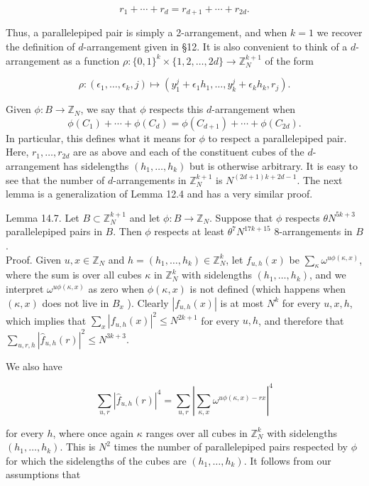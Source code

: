 \documentclass[10pt]{article}
\begin{document}
$$
r_{1}+\cdots+r_{d}=r_{d+1}+\cdots+r_{2 d} .
$$

Thus, a parallelepiped pair is simply a 2-arrangement, and when $k=1$ we recover the definition of $d$-arrangement given in §12. It is also convenient to think of a $d$-arrangement as a function $\rho:\{0,1\}^{k} \times\{1,2, \ldots, 2 d\} \rightarrow \mathbb{Z}_{N}^{k+1}$ of the form

$$
\rho:\left(\epsilon_{1}, \ldots, \epsilon_{k}, j\right) \mapsto\left(y_{1}^{j}+\epsilon_{1} h_{1}, \ldots, y_{k}^{j}+\epsilon_{k} h_{k}, r_{j}\right) .
$$

Given $\phi:B\to\mathbb Z_N$, we say that $\phi$ respects this
$d$-arrangement when
\[
  \phi(C_1)+\cdots+\phi(C_d)
  =\phi(C_{d+1})+\cdots+\phi(C_{2d}).
\]
In particular, this defines what it means for $\phi$ to respect a
parallelepiped pair. Here, $r_{1}, \ldots, r_{2 d}$ are as above and each of the constituent cubes of the $d$-arrangement has sidelengths $\left(h_{1}, \ldots, h_{k}\right)$ but is otherwise arbitrary. It is easy to see that the number of $d$-arrangements in $\mathbb{Z}_{N}^{k+1}$ is $N^{(2 d+1) k+2 d-1}$. The next lemma is a generalization of Lemma 12.4 and has a very similar proof.

Lemma 14.7. Let $B \subset \mathbb{Z}_{N}^{k+1}$ and let $\phi: B \rightarrow \mathbb{Z}_{N}$. Suppose that $\phi$ respects $\theta N^{5 k+3}$ parallelepiped pairs in $B$. Then $\phi$ respects at least $\theta^{7} N^{17 k+15}$ 8-arrangements in $B$.\\
Proof. Given $u, x \in \mathbb{Z}_{N}$ and $h=\left(h_{1}, \ldots, h_{k}\right) \in \mathbb{Z}_{N}^{k}$, let $f_{u, h}(x)$ be $\sum_{\kappa} \omega^{u \phi(\kappa, x)}$, where the sum is over all cubes $\kappa$ in $\mathbb{Z}_{N}^{k}$ with sidelengths $\left(h_{1}, \ldots, h_{k}\right)$, and we interpret $\omega^{u \phi(\kappa, x)}$ as zero when $\phi(\kappa, x)$ is not defined (which happens when $(\kappa, x)$ does not live in $B_{x}$ ). Clearly $\left|f_{u, h}(x)\right|$ is at most $N^{k}$ for every $u, x, h$, which implies that $\sum_{x}\left|f_{u, h}(x)\right|^{2} \leqslant N^{2 k+1}$ for every $u, h$, and therefore that $\sum_{u, r, h}\left|\hat{f}_{u, h}(r)\right|^{2} \leqslant N^{3 k+3}$.

We also have

$$
\sum_{u, r}\left|\hat{f}_{u, h}(r)\right|^{4}=\sum_{u, r}\left|\sum_{\kappa, x} \omega^{u \phi(\kappa, x)-r x}\right|^{4}
$$

for every $h$, where once again $\kappa$ ranges over all cubes in $\mathbb{Z}_{N}^{k}$ with sidelengths $\left(h_{1}, \ldots, h_{k}\right)$. This is $N^{2}$ times the number of parallelepiped pairs respected by $\phi$ for which the sidelengths of the cubes are $\left(h_{1}, \ldots, h_{k}\right)$. It follows from our assumptions that
\end{document}
